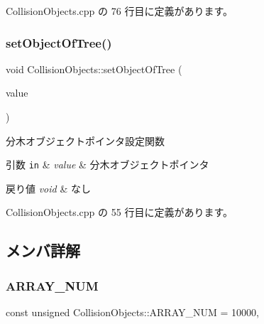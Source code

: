 Collision\+Objects.\+cpp の 76 行目に定義があります。

\mbox{\label{class_collision_objects_a3d5a69741d66dcdebfae5a54a15c4b88}} 
\subsubsection{\texorpdfstring{set\+Object\+Of\+Tree()}{setObjectOfTree()}}
{\footnotesize\ttfamily void Collision\+Objects\+::set\+Object\+Of\+Tree (\begin{DoxyParamCaption}\item[{\mbox{\hyperlink{class_object_of_tree}{Object\+Of\+Tree}}$<$ \mbox{\hyperlink{class_collision_objects}{Collision\+Objects}} $\ast$$>$ $\ast$}]{value }\end{DoxyParamCaption})}



分木オブジェクトポインタ設定関数 


\begin{DoxyParams}[1]{引数}
\mbox{\tt in}  & {\em value} & 分木オブジェクトポインタ \\
\hline
\end{DoxyParams}

\begin{DoxyRetVals}{戻り値}
{\em void} & なし \\
\hline
\end{DoxyRetVals}


 Collision\+Objects.\+cpp の 55 行目に定義があります。



\subsection{メンバ詳解}
\mbox{\label{class_collision_objects_a907cb151a9bbdd323eba56a4e4e1ee76}} 
\subsubsection{\texorpdfstring{A\+R\+R\+A\+Y\+\_\+\+N\+UM}{ARRAY\_NUM}}
{\footnotesize\ttfamily const unsigned Collision\+Objects\+::\+A\+R\+R\+A\+Y\+\_\+\+N\+UM = 10000\hspace{0.3cm}{\ttfamily [static]}, {\ttfamily [private]}}




